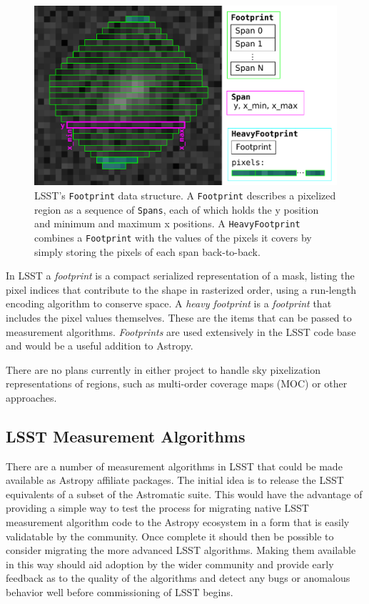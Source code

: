 \documentclass[]{spie}  %
\begin{document}
\begin{figure} [t]
\begin{center}
\includegraphics[width=\textwidth]{footprint}
\end{center}
\caption[footprint]
{\label{fig:footprint}
LSST's \texttt{Footprint} data structure.
A \texttt{Footprint} describes a pixelized region as a sequence of \texttt{Spans}, each of which holds the y position and minimum and maximum x positions.  A \texttt{HeavyFootprint} combines a \texttt{Footprint} with the values of the pixels it covers by simply storing the pixels of each span back-to-back.}
\end{figure}

In LSST a \emph{footprint} is a compact serialized representation of a mask, listing the pixel indices that contribute to the shape in rasterized order, using a run-length encoding algorithm to conserve space.
A \emph{heavy footprint} is a \emph{footprint} that includes the pixel values themselves.
These are the items that can be passed to measurement algorithms.
\emph{Footprints} are used extensively in the LSST code base and would be a useful addition to Astropy.

There are no plans currently in either project to handle sky pixelization representations of regions, such as multi-order coverage maps (MOC)\cite{2012ASPC..461..347F,2014ivoa.spec.0602F} or other approaches\cite{2015A&A...580A.132R}.

\subsection{LSST Measurement Algorithms}

There are a number of measurement algorithms in LSST that could be made available as Astropy affiliate packages\cite{bosch_2016_48435}.
The initial idea is to release the LSST equivalents of a subset of the Astromatic suite\cite{2012ASSP...29...71B}.
This would have the advantage of providing a simple way to test the process for migrating native LSST measurement algorithm code to the Astropy ecosystem in a form that is easily validatable by the community.
Once complete it should then be possible to consider migrating the more advanced LSST algorithms.
Making them available in this way should aid adoption by the wider community and provide early feedback as to the quality of the algorithms and detect any bugs or anomalous behavior well before commissioning of LSST begins.
\end{document}
